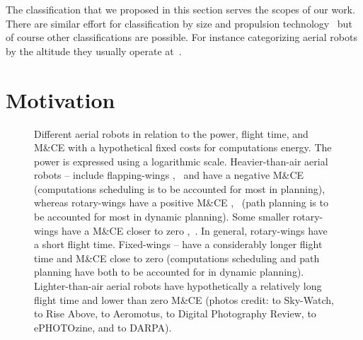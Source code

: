 The classification that we proposed in this section serves the scopes of our work. There are similar effort for classification by size and propulsion technology~\citep{hoffer2014survey,cabreira2019survey} but of course other classifications are possible. For instance categorizing aerial robots by the altitude they usually operate at~\citep{watts2012unmanned}.

\section{Motivation}
\label{sec:motivation}

\begin{figure}[p!]
  \centering
  \footnotesize{}\selectfont
  
  \vspace*{52pt}
  \caption[Different aerial robots in relation to the power, flight time, and M\&CE]{Different aerial robots in relation to the power, flight time, and M\&CE with a hypothetical fixed costs for computations energy. The power is expressed using a logarithmic scale. Heavier-than-air aerial robots -- include flapping-wings ,~ and have a negative M\&CE (computations scheduling is to be accounted for most in planning), whereas rotary-wings have a positive M\&CE ,~ (path planning is to be accounted for most in dynamic planning). Some smaller rotary-wings have a M\&CE closer to zero ,~. In general, rotary-wings have a short flight time. Fixed-wings -- have a considerably longer flight time and M\&CE close to zero (computations scheduling and path planning have both to be accounted for in dynamic planning). Lighter-than-air aerial robots  have hypothetically a relatively long flight time and lower than zero M\&CE {\scriptsize(photos credit:  to Sky-Watch,  to Rise Above,  to Aeromotus,  to Digital Photography Review,  to ePHOTOzine, and  to DARPA)}.}
  \label{fig:robots-vs-power}
\end{figure}

